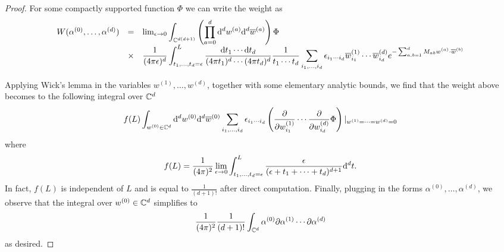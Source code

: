 \begin{proof}
For some compactly supported function $\Phi$ we can write the weight as
\[
\begin{array}{ccl}
W (\alpha^{(0)}, \ldots, \alpha^{(d)}) & = & \lim_{\epsilon \to 0} \displaystyle \int_{\mathbb C^{d(d+1)}} \left(\prod_{a = 0}^{d} {\rm d}^d w^{(a)} {\rm d}^d \overline{w}^{(a)}\right) \Phi \\ & \times & \displaystyle \frac{1}{(4 \pi \epsilon)^d} \int_{t_1,\ldots,t_d = \epsilon}^L \frac{{\rm d} t_1 \cdots {\rm d} t_d}{(4 \pi t_1)^d \cdots (4 \pi t_d)^d} \frac{1}{t_1\cdots t_d} \sum_{i_1,\ldots, i_d} \epsilon_{i_1\cdots i_d} \overline{w}_{i_1}^{(1)} \cdots \overline{w}_{i_d}^{(d)} e^{-\sum_{a,b = 1}^d M_{a b} w^{(a)} \cdot \overline{w}^{(b)}} 
\end{array}
\]

Applying Wick's lemma in the variables $w^{(1)}, \ldots, w^{(d)}$, together with some elementary analytic bounds, we find that the weight above becomes to the following integral over $\mathbb C^d$
\[
f(L) \int_{w^{(0)} \in \mathbb C^d}  {\rm d}^d w^{(0)} {\rm d}^d \overline{w}^{(0)} \sum_{i_1,\ldots, i_d} \epsilon_{i_1\cdots i_d}  
\left(\frac{\partial}{\partial w_{i_1}^{(1)}} \cdots \frac{\partial}{\partial w_{i_d}^{(d)}} \Phi\right)|_{w^{(1)}=\cdots=w^{(d)} = 0} 
\]
where
\[
f(L) = \frac{1}{(4\pi)^2} \lim_{\epsilon \to 0} \int_{t_1,\ldots,t_d = \epsilon}^L \frac{\epsilon}{(\epsilon + t_1 + \cdots + t_d)^{d+1}} {\rm d}^d t .
\]
In fact, $f(L)$ is independent of $L$ and is equal to $\frac{1}{(d+1)!}$ after direct computation. 
Finally, plugging in the forms $\alpha^{(0)}, \ldots, \alpha^{(d)}$, we observe that the integral over $w^{(0)} \in \mathbb C^d$ simplifies to
\[
\frac{1}{(4\pi)^2} \frac{1}{(d+1)!} \int_{\mathbb C^d} \alpha^{(0)} \partial \alpha^{(1)} \cdots\partial \alpha^{(d)}
\]
as desired.
\end{proof}